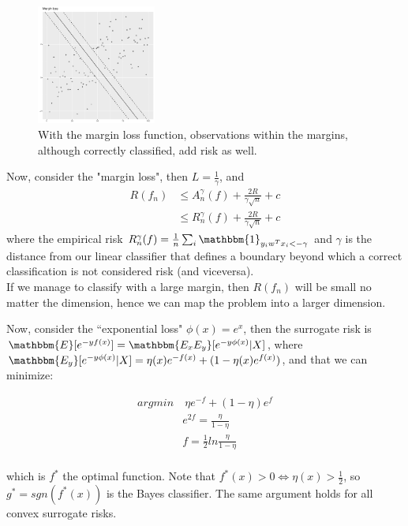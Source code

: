 \documentclass[11pt, english]{article}
\begin{document}
 
 \begin{figure}
 	\centering
 	\includegraphics[width=0.35\textwidth]{marginloss.pdf}
 	\caption{\small With the margin loss function, observations within the margins, although correctly classified, add risk as well.}
 \end{figure}
 
 Now, consider the "margin loss", then $L = \frac{1}{\gamma}$, and
 \begin{align*}
 R(f_n) &\leq A_n^{\gamma}(f) + \frac{2R}{\gamma\sqrt{n}} + c\\
 &\leq R_n^{\gamma}(f) + \frac{2R}{\gamma\sqrt{n}} + c
 \end{align*}
 where the empirical risk $R_n^{\gamma}(f) = \frac{1}{n} \sum_i \mathbbm{1}_{y_iw^Tx_i < -\gamma}$ and $\gamma$ is the distance from our linear classifier that defines a boundary beyond which a correct classification is not considered risk (and viceversa).\\
 
 If we manage to classify with a large margin, then $R(f_n)$ will be small no matter the dimension, hence we can map the problem into a larger dimension.
 
 Now, consider the ``exponential loss" $\phi(x) = e^x$, then the surrogate risk is $\mathbbm{E}[e^{-yf(x)}] = \mathbbm{E_xE_y}[e^{-y\phi(x)}|X]$, where $\mathbbm{E_y}[e^{-y\phi(x)}|X] = \eta(x) e^{-f(x)} + (1-\eta(x)e^{f(x)})$, and that we can minimize:
 
 \begin{align*}
 arg min &\ \eta e^{-f} + (1-\eta)e^f\\
 & e^{2f} = \frac{\eta}{1 - \eta}\\
 & f = \frac{1}{2} ln \frac{\eta}{1 - \eta}
 \end{align*}
 \linebreak
 \linebreak
 \\
 which is $f^*$ the optimal function. Note that $f^*(x)>0 \Leftrightarrow \eta(x)>\frac{1}{2}$, so $g^* = sgn(f^*(x))$ is the Bayes classifier. The same argument holds for all convex surrogate risks.
 
\end{document}
